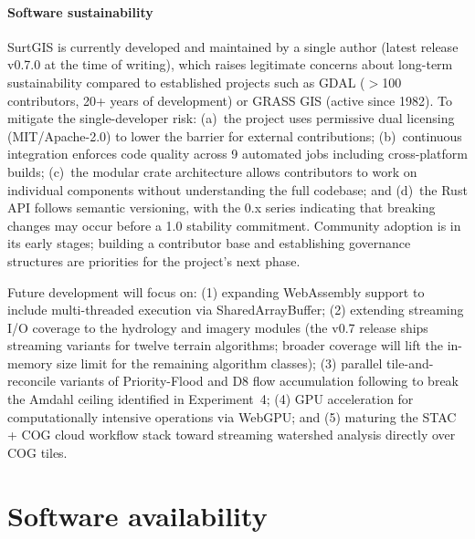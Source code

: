 \documentclass[preprint,review,12pt,authoryear]{elsarticle}
\begin{document}
\paragraph{Software sustainability} SurtGIS is currently developed and maintained by a single author (latest release v0.7.0 at the time of writing), which raises legitimate concerns about long-term sustainability compared to established projects such as GDAL ($>$100 contributors, 20+ years of development) or GRASS GIS (active since 1982). To mitigate the single-developer risk: (a)~the project uses permissive dual licensing (MIT/Apache-2.0) to lower the barrier for external contributions; (b)~continuous integration enforces code quality across 9 automated jobs including cross-platform builds; (c)~the modular crate architecture allows contributors to work on individual components without understanding the full codebase; and (d)~the Rust API follows semantic versioning, with the 0.x series indicating that breaking changes may occur before a 1.0 stability commitment. Community adoption is in its early stages; building a contributor base and establishing governance structures are priorities for the project's next phase.

Future development will focus on: (1) expanding WebAssembly support to include multi-threaded execution via SharedArrayBuffer; (2) extending streaming I/O coverage to the hydrology and imagery modules (the v0.7 release ships streaming variants for twelve terrain algorithms; broader coverage will lift the in-memory size limit for the remaining algorithm classes); (3) parallel tile-and-reconcile variants of Priority-Flood and D8 flow accumulation following \citet{barnes2017} to break the Amdahl ceiling identified in Experiment~4; (4) GPU acceleration for computationally intensive operations via WebGPU; and (5) maturing the STAC + COG cloud workflow stack toward streaming watershed analysis directly over COG tiles.

\section*{Software availability}
\end{document}

